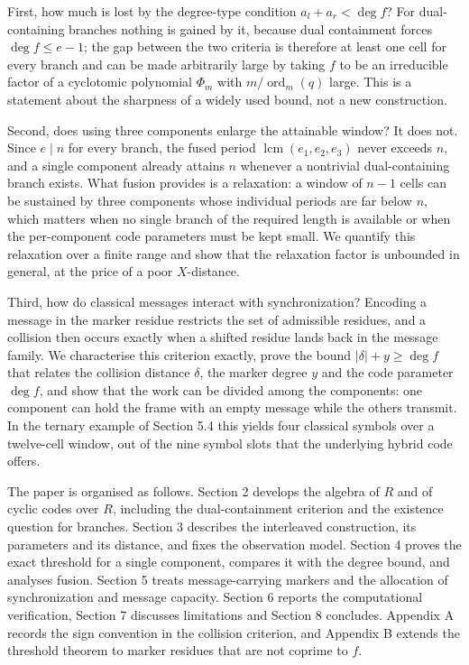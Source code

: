 \documentclass[11pt,reqno]{amsart}
\theoremstyle{definition}
\theoremstyle{remark}
\newcommand{\ord}{\operatorname{ord}}
\newcommand{\lcm}{\operatorname{lcm}}
\begin{document}
First, how much is lost by the degree-type condition $a_l+a_r<\deg f$? For dual-containing branches nothing is gained by it, because dual containment forces $\deg f\le e-1$; the gap between the two criteria is therefore at least one cell for every branch and can be made arbitrarily large by taking $f$ to be an irreducible factor of a cyclotomic polynomial $\Phi_m$ with $m/\ord_m(q)$ large. This is a statement about the sharpness of a widely used bound, not a new construction.


Second, does using three components enlarge the attainable window? It does not. Since $e\mid n$ for every branch, the fused period $\lcm(e_1,e_2,e_3)$ never exceeds $n$, and a single component already attains $n$ whenever a nontrivial dual-containing branch exists. What fusion provides is a relaxation: a window of $n-1$ cells can be sustained by three components whose individual periods are far below $n$, which matters when no single branch of the required length is available or when the per-component code parameters must be kept small. We quantify this relaxation over a finite range and show that the relaxation factor is unbounded in general, at the price of a poor $X$-distance.


Third, how do classical messages interact with synchronization? Encoding a message in the marker residue restricts the set of admissible residues, and a collision then occurs exactly when a shifted residue lands back in the message family. We characterise this criterion exactly, prove the bound $|\delta|+y\ge\deg f$ that relates the collision distance $\delta$, the marker degree $y$ and the code parameter $\deg f$, and show that the work can be divided among the components: one component can hold the frame with an empty message while the others transmit. In the ternary example of Section 5.4 this yields four classical symbols over a twelve-cell window, out of the nine symbol slots that the underlying hybrid code offers.


The paper is organised as follows. Section 2 develops the algebra of $R$ and of cyclic codes over $R$, including the dual-containment criterion and the existence question for branches. Section 3 describes the interleaved construction, its parameters and its distance, and fixes the observation model. Section 4 proves the exact threshold for a single component, compares it with the degree bound, and analyses fusion. Section 5 treats message-carrying markers and the allocation of synchronization and message capacity. Section 6 reports the computational verification, Section 7 discusses limitations and Section 8 concludes. Appendix A records the sign convention in the collision criterion, and Appendix B extends the threshold theorem to marker residues that are not coprime to $f$.
\end{document}
